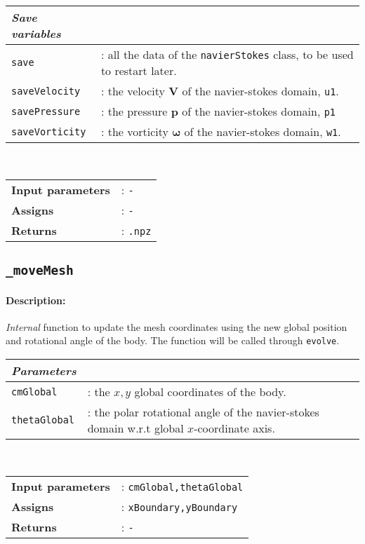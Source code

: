 		\begin{tabular}{lp{10cm}}
			\textit{Save variables} & \\ \hline
			\texttt{save} & : all the data of the \texttt{navierStokes} class, to be used to restart later.\\
			\texttt{saveVelocity} &: the velocity $\mathbf{V}$ of the navier-stokes domain, \texttt{u1}.\\ 
			\texttt{savePressure} &: the pressure $\mathbf{p}$ of the navier-stokes domain, \texttt{p1}\\ 
			\texttt{saveVorticity} &: the vorticity $\mathbf{\omega}$ of the navier-stokes domain, \texttt{w1}.\\ 
		\end{tabular} \vspace{5 mm}
	\\
	\begin{tabular}{lp{10cm}}
		\textbf{Input parameters} &: \texttt{-}\\ 
		\textbf{Assigns} &: \texttt{-}\\ 			
		\textbf{Returns} &: \texttt{.npz}\\ 					
	\end{tabular}

\subsection{\texttt{\_moveMesh}}
	\paragraph{Description:} \textit{Internal} function to update the mesh coordinates using the new global position and rotational angle of the body. The function will be called through \texttt{evolve}.\\
	
		\begin{tabular}{lp{10cm}}
			\textit{Parameters} & \\ \hline
			\texttt{cmGlobal} &: the $x,y$ global coordinates of the body.\\ 
			\texttt{thetaGlobal} &: the polar rotational angle of the navier-stokes domain w.r.t global $x$-coordinate axis.\\ 			
		\end{tabular} \vspace{5 mm}
	\\
	\begin{tabular}{lp{10cm}}
		\textbf{Input parameters} &: \texttt{cmGlobal,thetaGlobal}\\ 
		\textbf{Assigns} &: \texttt{xBoundary,yBoundary}\\ 			
		\textbf{Returns} &: \texttt{-}\\ 					
	\end{tabular}


